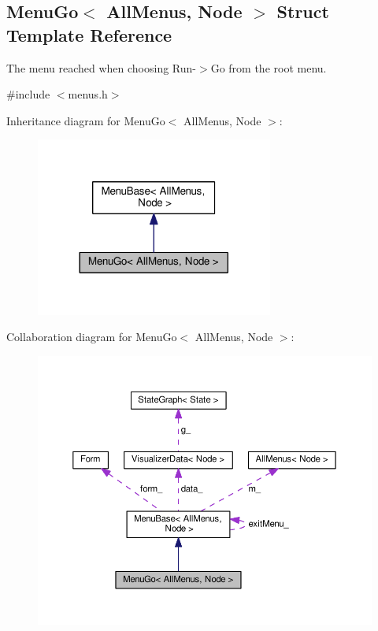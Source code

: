 \hypertarget{structMenuGo}{}\subsection{Menu\+Go$<$ All\+Menus, Node $>$ Struct Template Reference}
\label{structMenuGo}


The menu reached when choosing Run-\/$>$Go from the root menu.  




{\ttfamily \#include $<$menus.\+h$>$}



Inheritance diagram for Menu\+Go$<$ All\+Menus, Node $>$\+:\nopagebreak
\begin{figure}[H]
\begin{center}
\leavevmode
\includegraphics[width=221pt]{structMenuGo__inherit__graph}
\end{center}
\end{figure}


Collaboration diagram for Menu\+Go$<$ All\+Menus, Node $>$\+:\nopagebreak
\begin{figure}[H]
\begin{center}
\leavevmode
\includegraphics[width=350pt]{structMenuGo__coll__graph}
\end{center}
\end{figure}
